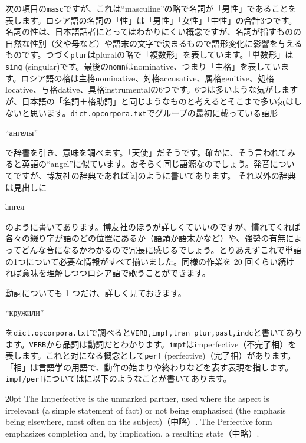 \documentclass[12pt]{ltjsarticle}
\begin{document}
次の項目の\texttt{masc}ですが、これは“masculine”の略で名詞が「男性」であることを表します。ロシア語の名詞の「性」は「男性」「女性」「中性」の合計3つです。名詞の性は、日本語話者にとってはわかりにくい概念ですが、名詞が指すものの自然な性別（父や母など）や語末の文字で決まるもので語形変化に影響を与えるものです。つづく\texttt{plur}はpluralの略で「複数形」を表しています。「単数形」は\texttt{sing} (singular)です。最後の\texttt{nomn}はnominative、つまり「主格」を表しています。ロシア語の格は主格nominative、対格accusative、属格genitive、処格locative、与格dative、具格instrumentalの6つです。6つは多いような気がしますが、日本語の「名詞＋格助詞」と同じようなものと考えるとそこまで多い気はしないと思います。\texttt{dict.opcorpora.txt}でグループの最初に載っている語形\begin{russian}“ангелы”\end{russian}で辞書を引き、意味を調べます。「天使」だそうです。確かに、そう言われてみると英語の“angel”に似ています。おそらく同じ語源なのでしょう。発音についてですが、博友社の辞典であれば[$\acute{\text{a}}$]のように書いてあります。
それ以外の辞典は見出しに\begin{russian}$\acute{\text{а}}$нгел\end{russian}のように書いてあります。博友社のほうが詳しくていいのですが、慣れてくれば各々の綴り字が語のどの位置にあるか（語頭か語末かなど）や、強勢の有無によってどんな音になるかわかるので冗長に感じるでしょう。とりあえずこれで単語の1つについて必要な情報がすべて揃いました。同様の作業を 20 回くらい続ければ意味を理解しつつロシア語で歌うことができます。

動詞についても 1 つだけ、詳しく見ておきます。\begin{russian}“кружили”\end{russian}を\texttt{dict.opcorpora.txt}で調べると\texttt{VERB,impf,tran plur,past,indc}と書いてあります。\texttt{VERB}から品詞は動詞だとわかります。\texttt{impf}はimperfective（不完了相）を表します。これと対になる概念として\texttt{perf} (perfective)（完了相）があります。
「相」は言語学の用語で、動作の始まりや終わりなどを表す表現を指します。\texttt{impf/perf}については\citep[p. 151]{cubberley2002}に以下のようなことが書いてあります。

\bigskip

\begin{indentation}{2\zw}{0pt}
The Imperfective is the unmarked partner, used where the aspect is irrelevant (a simple statement of fact) or not being emphasised (the emphasis being elsewhere, most often on the subject)（中略）. The Perfective form emphasizes completion and, by implication, a resulting state（中略）.
\end{indentation}
\end{document}
